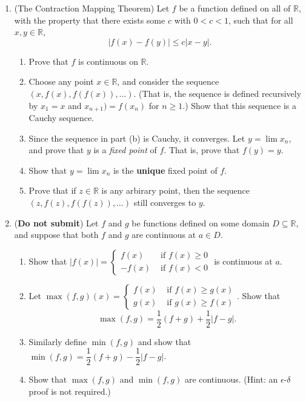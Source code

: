 \documentclass[letterpaper,12pt]{article}
\newcommand{\R}{\mathbb{R}}
\renewcommand{\ss}{\subseteq}
\newcommand{\abs}[1]{\lvert #1\rvert}
\begin{document}
\begin{enumerate}
 \item (The Contraction Mapping Theorem) Let $f$ be a function defined on all of $\R$, with the property that there exists some $c$ with $0<c<1$, such that for all $x, y\in \R$,
\[
 \abs{f(x)-f(y)}\leq c\abs{x-y}.
\]
\begin{enumerate}
 \item Prove that $f$ is continuous on $\R$.
 \item Choose any point $x\in\R$, and consider the sequence $(x,f(x),f(f(x)),\ldots)$. (That is, the sequence is defined recursively by $x_1=x$ and $x_{n+1}) = f(x_n)$ for $n\geq 1$.) Show that this sequence is a Cauchy sequence.
 \item Since the sequence in part (b) is Cauchy, it converges. Let $y=\lim x_n$, and prove that $y$ is a {\em fixed point} of $f$. That is, prove that $f(y)=y$.
 \item Show that $y=\lim x_n$ is the {\bf unique} fixed point of $f$.
 \item Prove that if $z\in \R$ is any arbirary point, then the sequence $(z,f(z),f(f(z)),\ldots)$ still converges to $y$.
\end{enumerate}
\item ({\bf Do not submit}) Let $f$ and $g$ be functions defined on some domain $D\ss\R$, and suppose that both $f$ and $g$ are continuous at $a\in D$.
\begin{enumerate}
 \item Show that $\displaystyle \abs{f(x)} = \begin{cases}f(x) & \text{ if } f(x)\geq 0\\ -f(x) & \text{ if } f(x)<0\end{cases}$ is continuous at $a$.
 \item Let $\max(f,g)(x) = \begin{cases} f(x) & \text{ if } f(x)\geq g(x)\\ g(x) & \text{ if } g(x)\geq f(x)\end{cases}$. Show that
\[
 \max(f,g) = \frac{1}{2}(f+g)+\frac{1}{2}\abs{f-g}.
\]
 \item Similarly define $\min(f,g)$ and show that $\min(f,g) = \dfrac{1}{2}(f+g)-\dfrac{1}{2}\abs{f-g}$.
 \item Show that $\max(f,g)$ and $\min(f,g)$ are continuous. (Hint: an $\epsilon$-$\delta$ proof is not required.)
\end{enumerate}


\end{enumerate}
\end{document}
